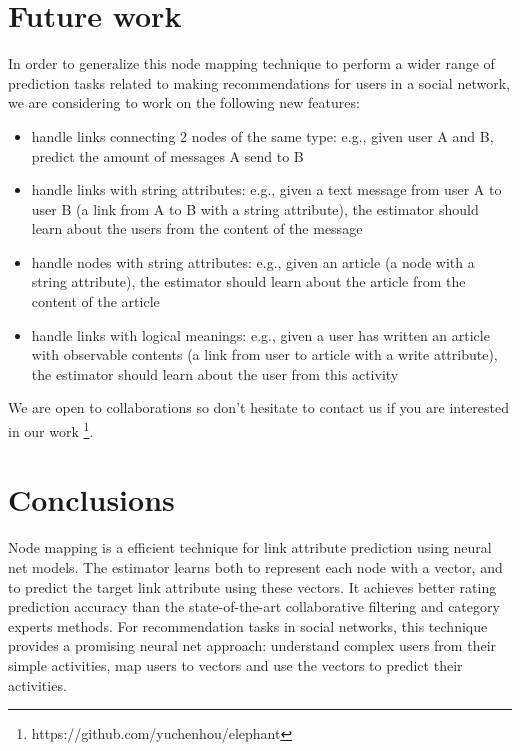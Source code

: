 \documentclass{article}
\begin{document}
\section{Future work}
In order to generalize this node mapping technique to perform a wider range of 
prediction tasks related to making recommendations for users in a social 
network, we are considering to work on the following new features:
\begin{itemize}
	\item handle links connecting 2 nodes of the same type: e.g., given user A 
	and B, predict the amount of messages A send to B
	\item handle links with string attributes: e.g., given a text message from 
	user A to user B (a link from A to B with a string attribute), the 
	estimator should learn about the users from the content of the message
	\item handle nodes with string attributes: e.g., given an article (a node 
	with a string attribute), the estimator should learn about the article from 
	the content of the article
	\item handle links with logical meanings: e.g., given a user has written an 
	article with observable contents (a link from user to article with a write 
	attribute), the estimator should learn about the user from this activity
\end{itemize}
We are open to collaborations so don't hesitate to contact us if you are 
interested in our work \footnote{https://github.com/yuchenhou/elephant}.

\section{Conclusions}
Node mapping is a efficient technique for link attribute prediction using 
neural net models. The estimator learns both to represent each node with a 
vector, and to predict the target link attribute using these vectors.
It achieves better rating prediction accuracy than the state-of-the-art 
collaborative filtering and category experts methods.
For recommendation tasks in social networks, this technique provides a 
promising neural net approach:
understand complex users from their simple activities, map users to 
vectors and use the vectors to predict their activities.



\end{document}
